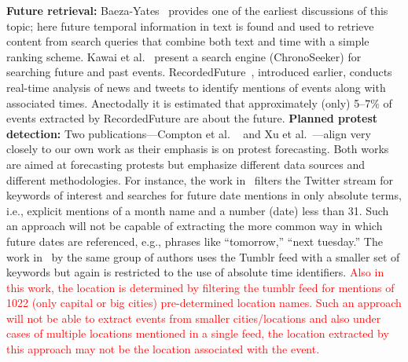 \documentclass[letterpaper]{article}
\begin{document}
{\bf Future retrieval:}
Baeza-Yates~\cite{baeza2005searching} provides one of the earliest discussions
of this topic; here future temporal information in text is found and used to retrieve content from search queries that 
combine both text and time with a simple ranking scheme. 
Kawai et al.~\cite{Kawai:2010:CSE} present a search engine (ChronoSeeker) for searching 
future and past events.
RecordedFuture~\cite{recordedFuture}, introduced earlier, conducts
real-time analysis of news and tweets to identify mentions of events along with associated times. Anectodally it 
is estimated that approximately (only) 5--7\% of events extracted 
by RecordedFuture are about the future.
{\bf Planned protest detection:}
Two publications---Compton et al. ~\cite{compton2013detecting} and Xu et al.~\cite{xu2014civil}---align very closely to our own work as their emphasis is on protest forecasting.
Both works are aimed at forecasting protests
but emphasize different data sources and different methodologies. For instance, the work in~\cite{compton2013detecting} filters the Twitter stream for
keywords of interest and searches for future date mentions in only absolute terms, i.e., explicit mentions of a month name and a number (date)
less than 31. 
Such an approach will not be capable of extracting the more
common way in which future dates are referenced, e.g., phrases like
``tomorrow,'' ``next tuesday.'' 
The work in~\cite{xu2014civil} by the same group of authors uses the Tumblr feed with a smaller set of keywords but
again is restricted to the use of absolute time identifiers. 
\textcolor{red}{Also in this work, the location is determined by filtering the tumblr feed for mentions of 1022 (only capital or big cities) pre-determined location names. Such an approach will not be able to extract events from smaller cities/locations and also under cases of multiple locations mentioned in a single feed, the location extracted by this approach may not be the location associated with the event.}

\vspace{-0.5em}
\end{document}
